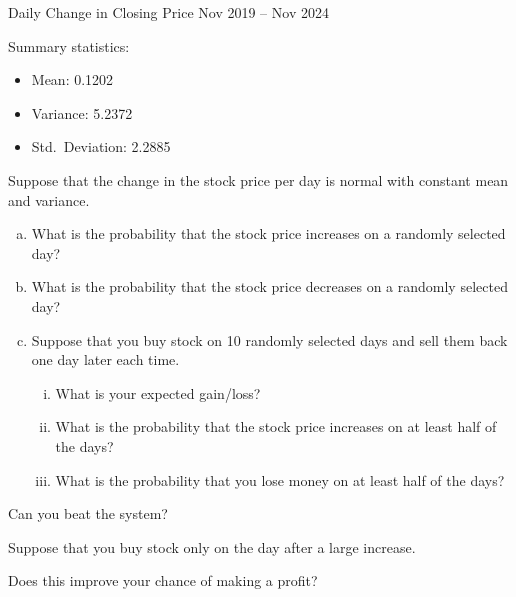 \begin{frame}
  \begin{block}{Daily Change in Closing Price Nov 2019 -- Nov 2024}
    
    Summary statistics:
    \begin{itemize}
    \item Mean: 0.1202
    \item Variance: 5.2372
    \item Std.~Deviation: 2.2885
    \end{itemize}
  \end{block}
\end{frame}

\begin{frame}

  \begin{block}{\example}
    Suppose that the change in the stock price per day is normal with constant mean and variance.  
    \begin{enumerate}[a)]
    \item What is the probability that the stock price increases on a randomly selected day?
    \item What is the probability that the stock price decreases on a randomly selected day?
    \item Suppose that you buy stock on 10 randomly selected days and sell them back one day later each time.
     \begin{enumerate}[i)]
        \item What is your expected gain/loss?
        \item What is the probability that the stock price increases on at least half of the days?
        \item What is the probability that you lose money on at least half of the days?
      \end{enumerate}
    \end{enumerate}
  \end{block}
\end{frame}

\begin{frame}

  \begin{center}
  {\Large Can you beat the system?}
  
  \pause
  
  \bigskip
  
  Suppose that you buy stock only on the day after a large increase. 
  
  Does this improve your chance of making a profit?
  \end{center}
  
\end{frame}



